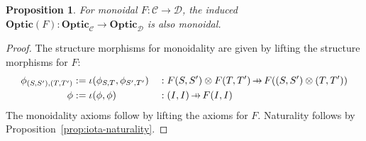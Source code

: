 \documentclass[11pt,letterpaper]{article}
\theoremstyle{plain}
\newtheorem{proposition}[theorem]{Proposition}
\theoremstyle{definition}
\newcommand{\C}{\mathscr{C}}
\newcommand{\D}{\mathscr{D}}
\newcommand{\Optic}{\mathbf{Optic}}
\newcommand{\hto}{\ensuremath{\,\mathaccent\shortmid\rightarrow\,}}
\begin{document}
\begin{proposition}
  For monoidal $F : \C \to \D$, the induced $\Optic(F) : \Optic_\C \to \Optic_\D$ is also monoidal.
\end{proposition}
\begin{proof}
The structure morphisms for monoidality are given by lifting the structure morphisms for $F$:
\begin{align*}
\phi_{(S, S'), (T, T')} &:= \iota(\phi_{S, T}, \phi_{S', T'}) &&: F(S, S') \otimes F(T, T') \hto F((S, S') \otimes (T, T')) \\
\phi &:= \iota(\phi, \phi) &&: (I, I) \hto F(I, I)
\end{align*}
The monoidality axioms follow by lifting the axioms for $F$. Naturality follows by Proposition~\ref{prop:iota-naturality}.
\end{proof}
\end{document}
